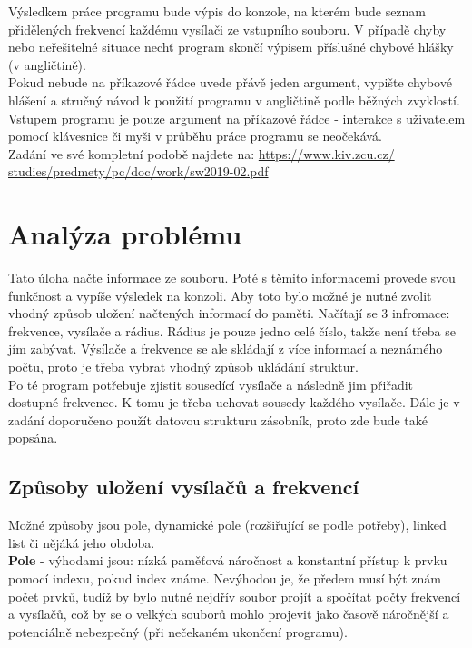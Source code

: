 \documentclass[12pt]{article}
\begin{document}
Výsledkem práce programu bude výpis do konzole, na kterém bude seznam
přidělených frekvencí každému vysílači ze vstupního souboru. V případě
chyby nebo neřešitelné situace nechť program skončí výpisem příslušné
chybové hlášky (v angličtině).\\

Pokud nebude na příkazové řádce uvede přávě jeden argument, vypište chybové
hlášení a stručný návod k použití programu v angličtině podle běžných 
zvyklostí. Vstupem programu je pouze argument na příkazové řádce - interakce
s uživatelem pomocí klávesnice či myši v průběhu práce programu se neočekává.\\

Zadání ve své kompletní podobě najdete na: \url{https://www.kiv.zcu.cz/
studies/predmety/pc/doc/work/sw2019-02.pdf}\\
%
%
\pagebreak
\section{Analýza problému}
Tato úloha načte informace ze souboru. Poté s těmito informacemi provede svou 
funkčnost a vypíše výsledek na konzoli. Aby toto bylo možné je nutné zvolit
vhodný způsob uložení načtených informací do paměti. Načítají se 3 infromace: 
frekvence, vysílače a rádius. Rádius je pouze jedno celé číslo, takže není 
třeba se jím zabývat. Výsílače a frekvence se ale skládají z více informací 
a neznámého počtu, proto je třeba vybrat vhodný způsob ukládání struktur.\\

Po té program potřebuje zjistit sousedící vysílače a následně jim přiřadit 
dostupné frekvence. K tomu je třeba uchovat sousedy každého vysílače.
Dále je v zadání doporučeno použít datovou strukturu zásobník, proto zde bude
také popsána.
\subsection{Způsoby uložení vysílačů a frekvencí}
Možné způsoby jsou pole, dynamické pole (rozšiřující se podle potřeby), linked 
list či nějáká jeho obdoba.\\

\textbf{Pole} - výhodami jsou: nízká paměťová náročnost a konstantní přístup
k prvku pomocí indexu, pokud index známe. Nevýhodou je, že předem musí být 
znám počet prvků, tudíž by bylo nutné nejdřív soubor projít a spočítat počty 
frekvencí a vysílačů, což by se o velkých souborů mohlo projevit jako časově 
náročnější a potenciálně nebezpečný (při nečekaném ukončení programu).\\
\end{document}
